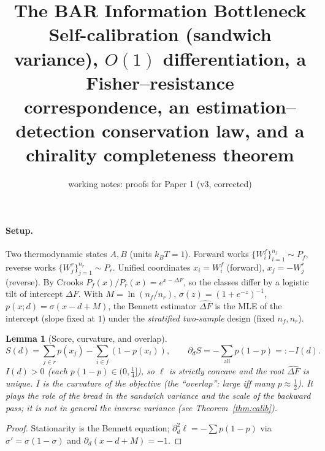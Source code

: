 \documentclass[11pt]{article}
\title{\vspace{-2em}The BAR Information Bottleneck\\[2pt]
\large Self-calibration (sandwich variance), $O(1)$ differentiation, a Fisher--resistance\\ correspondence, an estimation--detection conservation law, and a chirality completeness theorem}
\author{\normalsize working notes: proofs for Paper 1 (v3, corrected)}
\date{}
\theoremstyle{plain}
\newtheorem{lemma}{Lemma}
\theoremstyle{remark}
\newcommand{\dFh}{\widehat{\Delta F}}
\newcommand{\dF}{\Delta F}
\begin{document}
\maketitle
\vspace{-2.5em}

\paragraph{Setup.} Two thermodynamic states $A,B$ (units $k_BT{=}1$). Forward works $\{W^f_i\}_{i=1}^{n_f}\sim P_f$, reverse works $\{W^r_j\}_{j=1}^{n_r}\sim P_r$. Unified coordinates $x_i=W^f_i$ (forward), $x_j=-W^r_j$ (reverse). By Crooks $P_f(x)/P_r(x)=e^{x-\dF}$, so the classes differ by a logistic tilt of intercept $\dF$. With $M=\ln(n_f/n_r)$, $\sigma(z)=(1+e^{-z})^{-1}$, $p(x;d)=\sigma(x-d+M)$, the Bennett estimator $\dFh$ is the MLE of the intercept (slope fixed at $1$) under the \emph{stratified two-sample} design (fixed $n_f,n_r$).

\begin{lemma}[Score, curvature, and overlap]\label{lem:fisher}
\[
S(d)=\sum_{j\in r}p(x_j)-\sum_{i\in f}(1-p(x_i)),\qquad
\partial_d S=-\!\sum_{\text{all}}p(1-p)=:-I(d).
\]
$I(d)>0$ (each $p(1-p)\in(0,\tfrac14]$), so $\ell$ is strictly concave and the root $\dFh$ is unique. $I$ is the \emph{curvature} of the objective (the ``overlap'': large iff many $p\approx\tfrac12$). It plays the role of the bread in the sandwich variance and the scale of the backward pass; it is \emph{not} in general the inverse variance (see Theorem~\ref{thm:calib}).
\end{lemma}
\begin{proof}
Stationarity is the Bennett equation; $\partial_d^2\ell=-\sum p(1-p)$ via $\sigma'=\sigma(1-\sigma)$ and $\partial_d(x-d+M)=-1$.
\end{proof}
\end{document}
